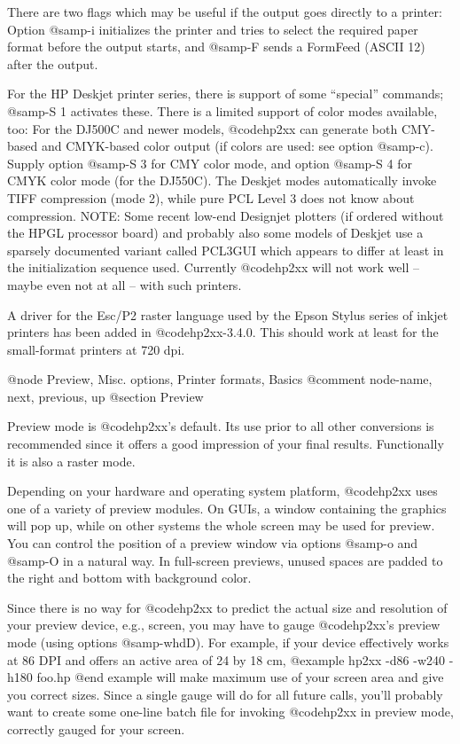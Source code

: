 There are two flags which may be useful if the output goes directly
to a printer: Option @samp{-i} initializes the printer and tries to select
the required paper format before the output starts, and @samp{-F} sends a 
FormFeed (ASCII 12) after the output.

For the HP Deskjet printer series, there is support of some ``special''
commands; @samp{-S 1} activates these. There is a limited support of color
modes available, too: For the DJ500C and newer models, @code{hp2xx} can
generate both CMY-based and CMYK-based color output (if colors are used:
see option @samp{-c}). Supply option @samp{-S 3} for CMY color mode, and
option @samp{-S 4} for CMYK color mode (for the DJ550C). The Deskjet modes
automatically invoke TIFF compression (mode 2), while pure PCL Level 3
does not know about compression. NOTE: Some recent low-end Designjet
plotters (if ordered without the HPGL processor board) and probably also 
some models of Deskjet use a sparsely documented variant called PCL3GUI
which appears to differ at least in the initialization sequence used. 
Currently @code{hp2xx} will not work well -- maybe even not at all -- with 
such printers.

A driver for the Esc/P2 raster language used by the Epson Stylus series
of inkjet printers has been added in @code{hp2xx-3.4.0}. This should work 
at least for the small-format printers at 720 dpi.

@node Preview, Misc. options, Printer formats, Basics
@comment  node-name,  next,  previous,  up
@section Preview

Preview mode is @code{hp2xx}'s default. Its use prior to all other
conversions is recommended since it offers a good impression of your
final results. Functionally it is also a raster mode.

Depending on your hardware and operating system platform,
@code{hp2xx} uses one of a variety of preview modules.
On GUIs, a window containing the graphics will pop up, while on other
systems the whole screen may be used for preview. You can control the
position of a preview window via options @samp{-o} and @samp{-O} in
a natural way. In full-screen previews, unused spaces are padded to the
right and bottom with background color.

Since there is no way for @code{hp2xx} to predict the actual size and
resolution of your preview device, e.g., screen, you may have to
gauge @code{hp2xx}'s preview mode (using options @samp{-whdD}). For example,
if your device effectively works at 86 DPI and offers an active area of
24 by 18 cm,
@example
hp2xx -d86 -w240 -h180 foo.hp
@end example
will make maximum use of your screen area and give you correct sizes.
Since a single gauge will do for all future calls, you'll probably want
to create some one-line batch file for invoking @code{hp2xx} in preview
mode, correctly gauged for your screen.


